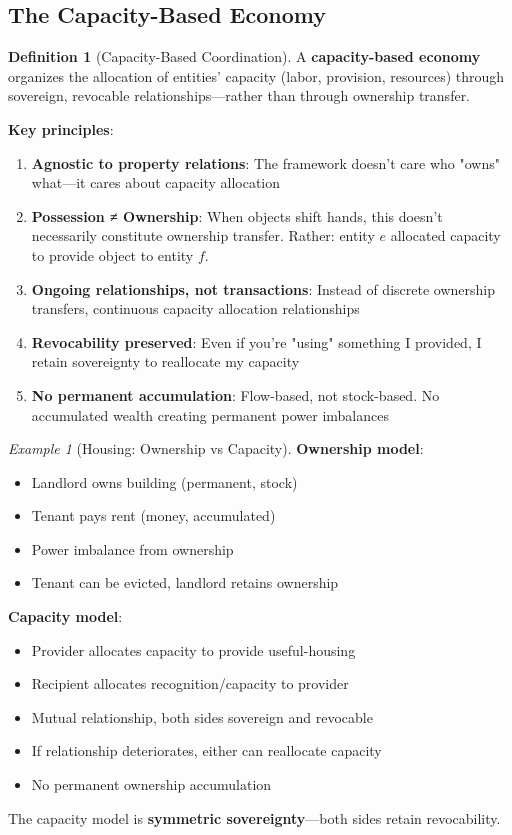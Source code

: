 \documentclass[11pt,a4paper]{article}
\theoremstyle{definition}
\newtheorem{definition}[theorem]{Definition}
\theoremstyle{remark}
\newtheorem{example}[theorem]{Example}
\begin{document}
\subsection{The Capacity-Based Economy}

\begin{definition}[Capacity-Based Coordination]
A \textbf{capacity-based economy} organizes the allocation of entities' capacity (labor, provision, resources) through sovereign, revocable relationships—rather than through ownership transfer.
\end{definition}

\textbf{Key principles}:

\begin{enumerate}
\item \textbf{Agnostic to property relations}: The framework doesn't care who "owns" what—it cares about capacity allocation

\item \textbf{Possession ≠ Ownership}: When objects shift hands, this doesn't necessarily constitute ownership transfer. Rather: entity $e$ allocated capacity to provide object to entity $f$.

\item \textbf{Ongoing relationships, not transactions}: Instead of discrete ownership transfers, continuous capacity allocation relationships

\item \textbf{Revocability preserved}: Even if you're "using" something I provided, I retain sovereignty to reallocate my capacity

\item \textbf{No permanent accumulation}: Flow-based, not stock-based. No accumulated wealth creating permanent power imbalances
\end{enumerate}

\begin{example}[Housing: Ownership vs Capacity]
\textbf{Ownership model}:
\begin{itemize}
\item Landlord owns building (permanent, stock)
\item Tenant pays rent (money, accumulated)
\item Power imbalance from ownership
\item Tenant can be evicted, landlord retains ownership
\end{itemize}

\textbf{Capacity model}:
\begin{itemize}
\item Provider allocates capacity to provide useful-housing
\item Recipient allocates recognition/capacity to provider
\item Mutual relationship, both sides sovereign and revocable
\item If relationship deteriorates, either can reallocate capacity
\item No permanent ownership accumulation
\end{itemize}

The capacity model is \textbf{symmetric sovereignty}—both sides retain revocability.
\end{example}
\end{document}
